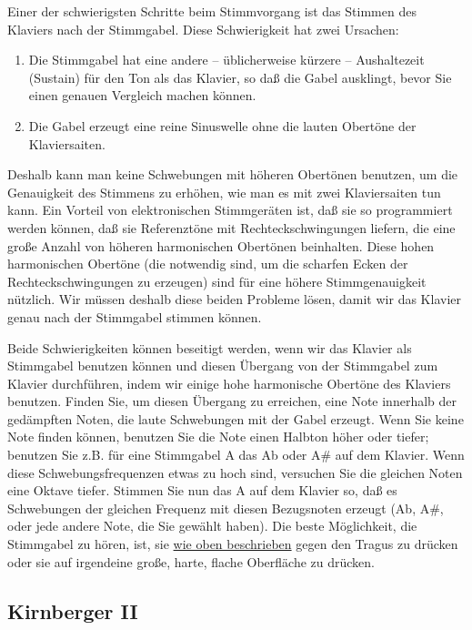 Einer der schwierigsten Schritte beim Stimmvorgang ist das Stimmen des Klaviers nach der Stimmgabel.
Diese Schwierigkeit hat zwei Ursachen:

\begin{enumerate}[label={\arabic*.}] 
 \item Die Stimmgabel hat eine andere -- üblicherweise kürzere -- Aushaltezeit (Sustain) für den Ton als das
 Klavier, so daß die Gabel ausklingt, bevor Sie einen genauen Vergleich machen können.
 \item Die Gabel erzeugt eine reine Sinuswelle ohne die lauten Obertöne der Klaviersaiten.
\end{enumerate}

Deshalb kann man keine Schwebungen mit höheren Obertönen benutzen, um die Genauigkeit des Stimmens zu erhöhen, wie man es mit zwei Klaviersaiten tun kann.
Ein Vorteil von elektronischen Stimmgeräten ist, daß sie so programmiert werden können, daß sie Referenztöne mit Rechteckschwingungen liefern, die eine große Anzahl von höheren harmonischen Obertönen beinhalten.
Diese hohen harmonischen Obertöne (die notwendig sind, um die scharfen Ecken der Rechteckschwingungen zu erzeugen) sind für eine höhere Stimmgenauigkeit nützlich.
Wir müssen deshalb diese beiden Probleme lösen, damit wir das Klavier genau nach der Stimmgabel stimmen können.

Beide Schwierigkeiten können beseitigt werden, wenn wir das Klavier als Stimmgabel benutzen können und diesen Übergang von der Stimmgabel zum Klavier durchführen, indem wir einige hohe harmonische Obertöne des Klaviers benutzen.
Finden Sie, um diesen Übergang zu erreichen, eine Note innerhalb der gedämpften Noten, die laute Schwebungen mit der Gabel erzeugt.
Wenn Sie keine Note finden können, benutzen Sie die Note einen Halbton höher oder tiefer; benutzen Sie z.B. für eine Stimmgabel A das Ab oder A\# auf dem Klavier.
Wenn diese Schwebungsfrequenzen etwas zu hoch sind, versuchen Sie die gleichen Noten eine Oktave tiefer.
Stimmen Sie nun das A auf dem Klavier so, daß es Schwebungen der gleichen Frequenz mit diesen Bezugsnoten erzeugt (Ab, A\#, oder jede andere Note, die Sie gewählt haben).
Die beste Möglichkeit, die Stimmgabel zu hören, ist, sie \hyperref[c2_3_gabel]{wie oben beschrieben} gegen den Tragus zu drücken oder sie auf irgendeine große, harte, flache Oberfläche zu drücken.
 

\label{c2_6c}
\subsection{Kirnberger II}
\label{c2_6_kirn}

